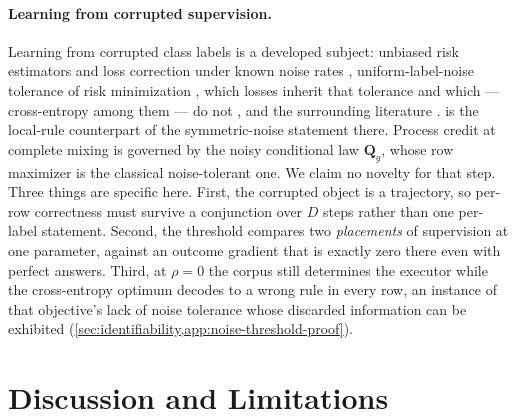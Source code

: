 \paragraph{Learning from corrupted supervision.}
Learning from corrupted class labels is a developed subject: unbiased risk
estimators and loss correction under known noise rates
\citep{natarajan2013noisy,patrini2017loss}, uniform-label-noise tolerance of
risk minimization \citep{manwani2013noise}, which losses inherit that
tolerance and which --- cross-entropy among them --- do not
\citep{ghosh2017robust}, and the surrounding literature
\citep{frenay2014classification}.  is the
local-rule counterpart of the symmetric-noise statement there. Process
credit at complete mixing is governed by the noisy conditional law
$\bm{Q}_g$, whose row maximizer is the classical noise-tolerant one. We
claim no novelty for that step. Three things are specific here.
First, the corrupted object is a trajectory, so per-row correctness must
survive a conjunction over $D$ steps rather than one per-label statement.
Second, the threshold compares two \emph{placements} of supervision at one
parameter, against an outcome gradient that is exactly zero there even
with perfect answers. Third, at $\rho=0$ the corpus still determines the executor while
the cross-entropy optimum decodes to a wrong rule in every row, an
instance of that objective's lack of noise tolerance
\citep{ghosh2017robust} whose discarded information can be exhibited
(\cref{sec:identifiability,app:noise-threshold-proof}).

\section{Discussion and Limitations}
\label{sec:discussion}

